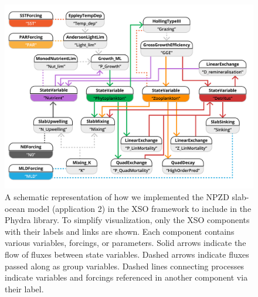 \documentclass[journal abbreviation, manuscript]{copernicus}
\begin{document}
\begin{figure}[t]
\includegraphics[width=15cm]{Figures/firstdraft_schematics/code_schematics/EMPOWER.pdf}
\caption{A schematic representation of how we implemented the NPZD slab-ocean model (application 2) in the XSO framework to include in the Phydra library. To simplify visualization, only the XSO components with their labels and links are shown. Each component contains various variables, forcings, or parameters. Solid arrows indicate the flow of fluxes between state variables. Dashed arrows indicate fluxes passed along as group variables. Dashed lines connecting processes indicate variables and forcings referenced in another component via their label.}
\label{Figure:CodeSchematics_2}
\end{figure}
\end{document}
